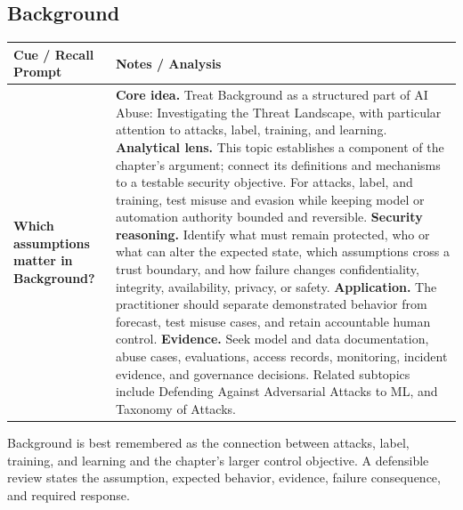 \documentclass[11pt]{article}
\newcommand{\CornellHeader}{%
\rowcolor{Navy}\color{white}\bfseries Cue / Recall Prompt & \color{white}\bfseries Notes / Analysis\\\hline}
\newcommand{\CornellRow}[2]{%
\cellcolor{CueGray}\RaggedRight\textbf{#1} & \RaggedRight #2\\\hline}
\begin{document}
\subsection*{Background}
\begin{longtable}{>{\RaggedRight\arraybackslash}p{}|>{\RaggedRight\arraybackslash}p{}}
\CornellHeader
\CornellRow{Which assumptions matter in Background?}{\textbf{Core idea.} Treat Background as a structured part of AI Abuse: Investigating the Threat Landscape, with particular attention to attacks, label, training, and learning. \textbf{Analytical lens.} This topic establishes a component of the chapter's argument; connect its definitions and mechanisms to a testable security objective. For attacks, label, and training, test misuse and evasion while keeping model or automation authority bounded and reversible. \textbf{Security reasoning.} Identify what must remain protected, who or what can alter the expected state, which assumptions cross a trust boundary, and how failure changes confidentiality, integrity, availability, privacy, or safety. \textbf{Application.} The practitioner should separate demonstrated behavior from forecast, test misuse cases, and retain accountable human control. \textbf{Evidence.} Seek model and data documentation, abuse cases, evaluations, access records, monitoring, incident evidence, and governance decisions. Related subtopics include Defending Against Adversarial Attacks to ML, and Taxonomy of Attacks.}
\end{longtable}
\begin{topicsummary}
Background is best remembered as the connection between attacks, label, training, and learning and the chapter's larger control objective. A defensible review states the assumption, expected behavior, evidence, failure consequence, and required response.
\end{topicsummary}
\end{document}
